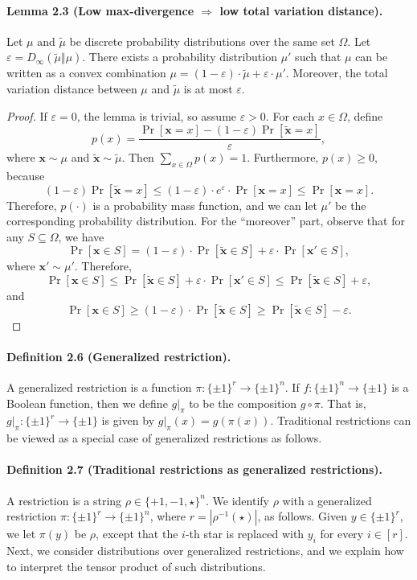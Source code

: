 \documentclass[10pt,a4paper]{article}
\begin{document}
\paragraph{Lemma 2.3 (Low max-divergence $\Rightarrow$ low total variation distance).} Let $\mu$ and $\widetilde\mu$ be discrete probability distributions over the same set $\Omega$. Let $\varepsilon=D_\infty(\widetilde\mu\Vert\mu)$. There exists a probability distribution $\mu'$ such that $\mu$ can be written as a convex combination $\mu=(1-\varepsilon)\cdot\widetilde\mu+\varepsilon\cdot\mu'$. Moreover, the total variation distance between $\mu$ and $\widetilde\mu$ is at most $\varepsilon$.
\begin{proof}
If $\varepsilon=0$, the lemma is trivial, so assume $\varepsilon>0$. For each $x\in\Omega$, define
\[p(x)=\frac{\Pr[\mathbf x=x]-(1-\varepsilon)\Pr[\widetilde{\mathbf x}=x]}{\varepsilon},\]
where $\mathbf x\sim\mu$ and $\widetilde{\mathbf x}\sim\widetilde\mu$. Then $\sum_{x\in\Omega}p(x)=1$. Furthermore, $p(x)\ge0$, because
\[(1-\varepsilon)\Pr[\widetilde{\mathbf x}=x]\le(1-\varepsilon)\cdot e^\varepsilon\cdot\Pr[\mathbf x=x]\le\Pr[\mathbf x=x].\]
Therefore, $p(\cdot)$ is a probability mass function, and we can let $\mu'$ be the corresponding probability distribution. For the ``moreover'' part, observe that for any $S\subseteq\Omega$, we have
\[\Pr[\mathbf x\in S]=(1-\varepsilon)\cdot\Pr[\widetilde{\mathbf x}\in S]+\varepsilon\cdot\Pr[\mathbf x'\in S],\]
where $\mathbf x'\sim\mu'$. Therefore,
\[\Pr[\mathbf x\in S]\le\Pr[\widetilde{\mathbf x}\in S]+\varepsilon\cdot\Pr[\mathbf x'\in S]\le\Pr[\widetilde{\mathbf x}\in S]+\varepsilon,\]
and
\[\Pr[\mathbf x\in S]\ge(1-\varepsilon)\cdot\Pr[\widetilde{\mathbf x}\in S]\ge\Pr[\widetilde{\mathbf x}\in S]-\varepsilon.\]
\end{proof}
\paragraph{Definition 2.6 (Generalized restriction).} A generalized restriction is a function $\pi:\{\pm1\}^r\to\{\pm1\}^n$. If $f:\{\pm1\}^n\to\{\pm1\}$ is a Boolean function, then we define $g|_\pi$ to be the composition $g\circ\pi$. That is, $g|_\pi:\{\pm1\}^r\to\{\pm1\}$ is given by $g|_\pi(x)=g(\pi(x))$.
Traditional restrictions can be viewed as a special case of generalized restrictions as follows.
\paragraph{Definition 2.7 (Traditional restrictions as generalized restrictions).} A restriction is a string $\rho\in\{+1,-1,\star\}^n$. We identify $\rho$ with a generalized restriction $\pi:\{\pm1\}^r\to\{\pm1\}^n$, where $r=|\rho^{-1}(\star)|$, as follows. Given $y\in\{\pm1\}^r$, we let $\pi(y)$ be $\rho$, except that the $i$-th star is replaced with $y_i$ for every $i\in[r]$.
Next, we consider distributions over generalized restrictions, and we explain how to interpret the tensor product of such distributions.
\end{document}
